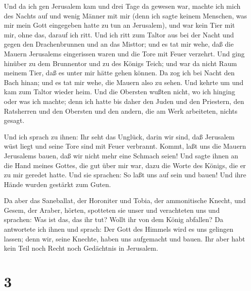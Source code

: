  Und da ich gen Jerusalem kam und drei Tage da gewesen war,
 machte ich mich des Nachts auf und wenig Männer mit mir
(denn ich sagte keinem Menschen, was mir mein Gott eingegeben hatte zu
tun an Jerusalem), und war kein Tier mit mir, ohne das, darauf ich ritt.
 Und ich ritt zum Taltor aus bei der Nacht und gegen den
Drachenbrunnen und an das Misttor; und es tat mir wehe, daß die Mauern
Jerusalems eingerissen waren und die Tore mit Feuer verzehrt.
 Und ging hinüber zu dem Brunnentor und zu des Königs
Teich; und war da nicht Raum meinem Tier, daß es unter mir hätte gehen
können.  Da zog ich bei Nacht den Bach hinan; und es tat
mir wehe, die Mauern also zu sehen. Und kehrte um und kam zum Taltor
wieder heim.  Und die Obersten wußten nicht, wo ich hinging
oder was ich machte; denn ich hatte bis daher den Juden und den
Priestern, den Ratsherren und den Obersten und den andern, die am Werk
arbeiteten, nichts gesagt.

 Und ich sprach zu ihnen: Ihr seht das Unglück, darin wir
sind, daß Jerusalem wüst liegt und seine Tore sind mit Feuer verbrannt.
Kommt, laßt uns die Mauern Jerusalems bauen, daß wir nicht mehr eine
Schmach seien!  Und sagte ihnen an die Hand meines Gottes,
die gut über mir war, dazu die Worte des Königs, die er zu mir geredet
hatte. Und sie sprachen: So laßt uns auf sein und bauen! Und ihre Hände
wurden gestärkt zum Guten.

 Da aber das Saneballat, der Horoniter und Tobia, der
ammonitische Knecht, und Gesem, der Araber, hörten, spotteten sie unser
und verachteten uns und sprachen: Was ist das, das ihr tut? Wollt ihr
von dem König abfallen?  Da antwortete ich ihnen und
sprach: Der Gott des Himmels wird es uns gelingen lassen; denn wir,
seine Knechte, haben uns aufgemacht und bauen. Ihr aber habt kein Teil
noch Recht noch Gedächtnis in Jerusalem.

\hypertarget{section-2}{%
\section{3}\label{section-2}}

